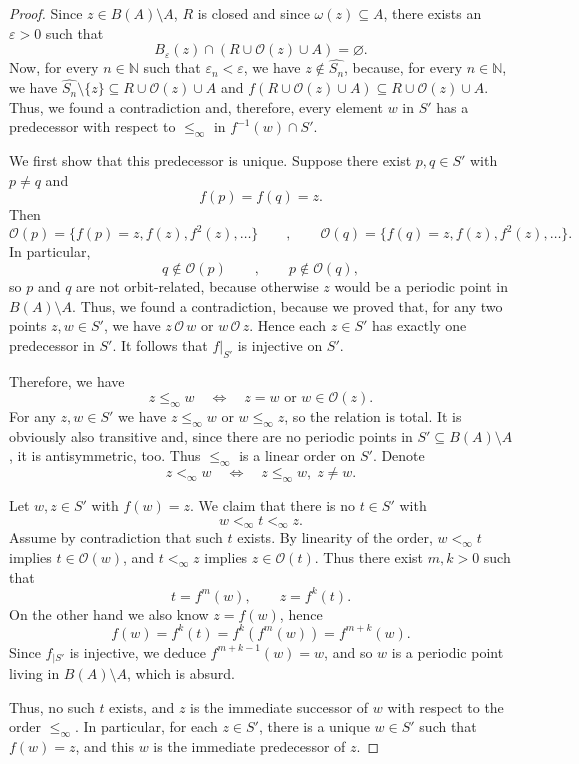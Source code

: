 \documentclass[10pt,a4paper]{article}
\theoremstyle{definition}
\theoremstyle{remark}
\theoremstyle{plain}
\begin{document}
\begin{proof}
Since $z\in B(A)\setminus A$, $R$ is closed and since $\omega(z)\subseteq A$, there exists an $\varepsilon>0$ such that
$$B_\varepsilon(z)\cap(R\cup\mathcal{O}(z)\cup A)=\varnothing.$$
Now, for every $n\in\mathbb N$ such that $\varepsilon_n<\varepsilon$, we have $z\notin\widehat{S_n}$, because, for every $n\in\mathbb N$, we have $\widehat{S_n}\setminus\{z\}\subseteq R\cup\mathcal{O}(z)\cup A$ and $f(R\cup\mathcal{O}(z)\cup A)\subseteq R\cup\mathcal{O}(z)\cup A$. Thus, we found a contradiction and, therefore, every element $w$ in $S'$ has a predecessor with respect to $\le_\infty$ in $f^{-1}(w)\cap S'$.

We first show that this predecessor is unique. Suppose there exist $p,q\in S'$ with $p\neq q$ and
$$
f(p)=f(q)=z.
$$
Then
$$
\mathcal{O}(p)=\{f(p)=z,f(z),f^2(z),\dots\}\qquad ,\qquad 
\mathcal{O}(q)=\{f(q)=z,f(z),f^2(z),\dots\}.
$$
In particular,
$$
q\notin\mathcal{O}(p)\qquad ,\qquad p\notin\mathcal{O}(q),
$$
so $p$ and $q$ are not orbit-related, because otherwise $z$ would be a periodic point in $B(A)\setminus A$. Thus, we found a contradiction, because we proved that, for any two points $z,w\in S'$, we have $z\,\mathcal{O}\,w$ or $w\,\mathcal{O}\,z$. Hence each $z\in S'$ has exactly one predecessor in $S'$. It follows that $f|_{S'}$ is injective on $S'$.


Therefore, we have
$$
z\le_\infty w \quad\Longleftrightarrow\quad z=w \text{ or } w\in\mathcal{O}(z).
$$
For any $z,w\in S'$ we have $z\le_\infty w$ or $w\le_\infty z$, so the relation is total. It is obviously also transitive and, since there are no periodic points in $S'\subseteq B(A)\setminus A$, it is antisymmetric, too.  Thus $\le_\infty$ is a linear order on $S'$. Denote
$$
z<_\infty w \quad\Longleftrightarrow\quad z\le_\infty w,\;z\neq w.
$$

Let $w,z\in S'$ with $f(w)=z$. We claim that there is no $t\in S'$ with
$$
w<_\infty t<_\infty z.
$$
Assume by contradiction that such $t$ exists. By linearity of the order, $w<_\infty t$ implies $t\in\mathcal{O}(w)$, and $t<_\infty z$ implies $z\in\mathcal{O}(t)$. Thus there exist $m,k>0$ such that
$$
t=f^m(w),\qquad z=f^k(t).
$$
On the other hand we also know $z=f(w)$, hence
$$
f(w)=f^k(t)=f^k(f^m(w))=f^{m+k}(w).
$$
Since $f_{|S'}$ is injective, we deduce $f^{m+k-1}(w)=w$, and so $w$ is a periodic point living in $B(A)\setminus A$, which is absurd.

Thus, no such $t$ exists, and $z$ is the immediate successor of $w$ with respect  to the order $\le_\infty$. In particular, for each $z\in S'$, there is a unique $w\in S'$ such that $f(w)=z$, and this $w$ is the immediate predecessor of $z$.


\end{proof}
\end{document}
